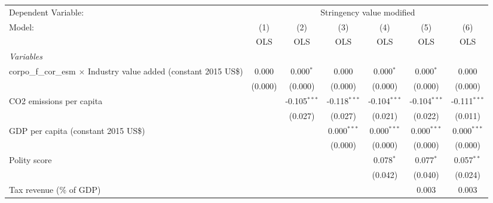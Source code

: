 
\begingroup
\centering
\begin{tabular}{lcccccc}
   \toprule
   Dependent Variable: & \multicolumn{6}{c}{Stringency value modified}\\
   Model:                                                                     & (1)     & (2)            & (3)            & (4)            & (5)            & (6)\\  
                                                                              &  OLS    & OLS            & OLS            & OLS            & OLS            & OLS\\  
   \midrule
   \emph{Variables}\\
   corpo\_f\_cor\_esm $\times$ Industry value added (constant 2015 US\$)      & 0.000   & 0.000$^{*}$    & 0.000          & 0.000$^{*}$    & 0.000$^{*}$    & 0.000\\   
                                                                              & (0.000) & (0.000)        & (0.000)        & (0.000)        & (0.000)        & (0.000)\\   
   CO2 emissions per capita                                                   &         & -0.105$^{***}$ & -0.118$^{***}$ & -0.104$^{***}$ & -0.104$^{***}$ & -0.111$^{***}$\\   
                                                                              &         & (0.027)        & (0.027)        & (0.021)        & (0.022)        & (0.011)\\   
   GDP per capita (constant 2015 US\$)                                        &         &                & 0.000$^{***}$  & 0.000$^{***}$  & 0.000$^{***}$  & 0.000$^{***}$\\   
                                                                              &         &                & (0.000)        & (0.000)        & (0.000)        & (0.000)\\   
   Polity score                                                               &         &                &                & 0.078$^{*}$    & 0.077$^{*}$    & 0.057$^{**}$\\   
                                                                              &         &                &                & (0.042)        & (0.040)        & (0.024)\\   
   Tax revenue (\% of GDP)                                                    &         &                &                &                & 0.003          & 0.003\\   

\end{tabular}

